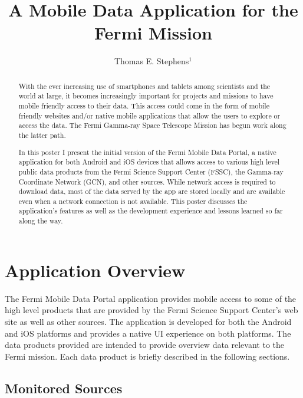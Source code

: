 \documentclass[11pt,twoside]{article}
\begin{document}
\title{A Mobile Data Application for the Fermi Mission}
\author{Thomas E. Stephens$^1$}

\begin{abstract}
With the ever increasing use of smartphones and tablets among scientists and the world at large, it becomes increasingly important for projects and missions to have mobile friendly access to their data. This access could come in the form of mobile friendly websites and/or native mobile applications that allow the users to explore or access the data. The Fermi Gamma-ray Space Telescope Mission has begun work along the latter path.

In this poster I present the initial version of the Fermi Mobile Data Portal, a native application for both Android and iOS devices that allows access to various high level public data products from the Fermi Science Support Center (FSSC), the Gamma-ray Coordinate Network (GCN), and other sources. While network access is required to download data, most of the data served by the app are stored locally and are available even when a network connection is not available. This poster discusses the application's features as well as the development experience and lessons learned so far along the way. 
\end{abstract}

\section{Application Overview}
The Fermi Mobile Data Portal application provides mobile access to some of the high level products  that are provided by the Fermi Science Support Center's web site as well as other sources.  The application is developed for both the Android and iOS platforms and provides a native UI experience on both platforms.  The data products provided are intended to provide overview data relevant to the Fermi mission.  Each data product is briefly described in the following sections.

\subsection{Monitored Sources}
\end{document}
